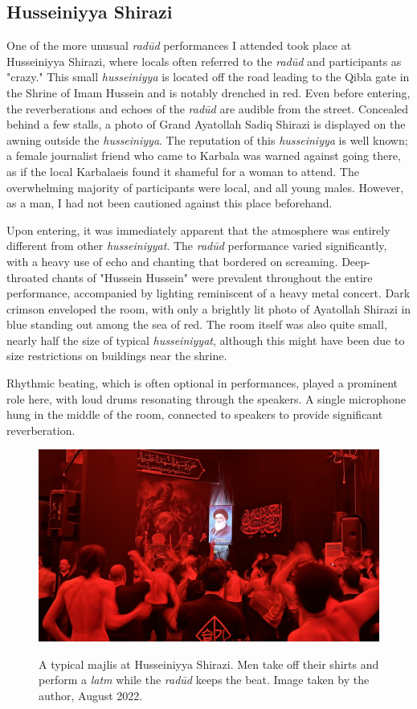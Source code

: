 \subsection{Husseiniyya Shirazi}
One of the more unusual \emph{radūd} performances I attended took place at Husseiniyya Shirazi, where locals often referred to the \emph{radūd} and participants as "crazy." This small \emph{husseiniyya} is located off the road leading to the Qibla gate in the Shrine of Imam Hussein and is notably drenched in red. Even before entering, the reverberations and echoes of the \emph{radūd} are audible from the street. Concealed behind a few stalls, a photo of Grand Ayatollah Sadiq Shirazi is displayed on the awning outside the \emph{husseiniyya}. The reputation of this \emph{husseiniyya} is well known; a female journalist friend who came to Karbala was warned against going there, as if the local Karbalaeis found it shameful for a woman to attend. The overwhelming majority of participants were local, and all young males. However, as a man, I had not been cautioned against this place beforehand.

Upon entering, it was immediately apparent that the atmosphere was entirely different from other \emph{husseiniyyat}. The \emph{radūd} performance varied significantly, with a heavy use of echo and chanting that bordered on screaming. Deep-throated chants of "Hussein Hussein" were prevalent throughout the entire performance, accompanied by lighting reminiscent of a heavy metal concert. Dark crimson enveloped the room, with only a brightly lit photo of Ayatollah Shirazi in blue standing out among the sea of red. The room itself was also quite small, nearly half the size of typical \emph{husseiniyyat}, although this might have been due to size restrictions on buildings near the shrine.

Rhythmic beating, which is often optional in performances, played a prominent role here, with loud drums resonating through the speakers. A single microphone hung in the middle of the room, connected to speakers to provide significant reverberation.

\begin{figure}
\caption{A typical majlis at Husseiniyya Shirazi. Men take off their shirts and perform a \emph{latm} while the \emph{radūd} keeps the beat. Image taken by the author, August 2022.}
\centering
\includegraphics[width=.75\textwidth]{images/shirazi.jpeg}
\label{fig:shirazi}
\end{figure}

